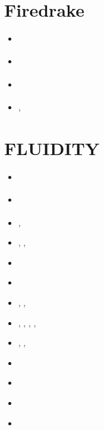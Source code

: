 \section{Firedrake}

\begin{small}
\begin{itemize}
\item[2016] \textcite{rahm16}
\item[2021] \textcite{befh21}
\item[2022] \textcite{dakg22}
\item[2024] \textcite{nisc24}, \textcite{ghgd24}
\end{itemize}
\end{small}



\section{FLUIDITY}

\begin{small}
\begin{itemize}
\item[\twothousandeleven]      \textcite{dawk11}
\item[\twothousandtwelve]      \textcite{krwd12}
\item[\twothousandfourteen]    \textcite{gagd14},  \textcite{ledg14}
\item[\twothousandsixteen]     \textcite{dalg16},  \textcite{jodc16}, \textcite{pegp16} 
\item[\twothousandseventeen]   \textcite{hegd17}
\item[\twothousandeighteen]    \textcite{pegp18}
\item[\twothousandtwenty]      \textcite{algg20},  \textcite{mapg20}, 
                               \textcite{gatt20}
\item[\twothousandtwentyone]   \textcite{sugm21},  \textcite{kndc21},
                               \textcite{befd21},  \textcite{dudm21},
                               \textcite{gath21} 
\item[\twothousandtwentytwo]   \textcite{cesg22},  \textcite{chdg22a}, \textcite{chdg22b}
\item[\twothousandtwentythree] \textcite{pidh23} 
\item[\twothousandtwentyfour]  \textcite{chdg24} 
\item[\twothousandtwentyfive]  \textcite{jidh25} 
\item[2026]  \textcite{vagt26} 

\end{itemize}
\end{small}


